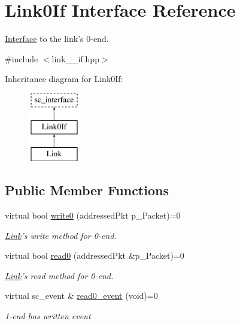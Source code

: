 \hypertarget{classLink0If}{\section{Link0\-If Interface Reference}
\label{classLink0If}
}


\hyperlink{classInterface}{Interface} to the link's 0-\/end.  




{\ttfamily \#include $<$link\-\_\-\_\-if.\-hpp$>$}

Inheritance diagram for Link0\-If\-:\begin{figure}[H]
\begin{center}
\leavevmode
\includegraphics[height=3.000000cm]{classLink0If}
\end{center}
\end{figure}
\subsection*{Public Member Functions}
\begin{DoxyCompactItemize}
\item 
virtual bool \hyperlink{classLink0If_ab93e2071be429d5199d4918f5962f729}{write0} (addressed\-Pkt p\-\_\-\-Packet)=0
\begin{DoxyCompactList}\small\item\em \hyperlink{classLink}{Link}'s write method for 0-\/end. \end{DoxyCompactList}\item 
virtual bool \hyperlink{classLink0If_a5f5b3e589ccba326e64658b3e58f621e}{read0} (addressed\-Pkt \&p\-\_\-\-Packet)=0
\begin{DoxyCompactList}\small\item\em \hyperlink{classLink}{Link}'s read method for 0-\/end. \end{DoxyCompactList}\item 
virtual sc\-\_\-event \& \hyperlink{classLink0If_a689fa9b8ec98a1aba98dde64f8c63eee}{read0\-\_\-event} (void)=0
\begin{DoxyCompactList}\small\item\em 1-\/end has written event \end{DoxyCompactList}\end{DoxyCompactItemize}


